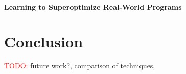 \documentclass[12pt,twoside]{reedthesis}
\newcommand{\red}[1]{\textcolor{red}{#1}}
\begin{document}
\subsubsection{Learning to Superoptimize Real-World Programs}
\cite{shypula2022learning}

\chapter{Conclusion}

\red{TODO:} future work?, comparison of techniques, 



\backmatter


\end{document}
